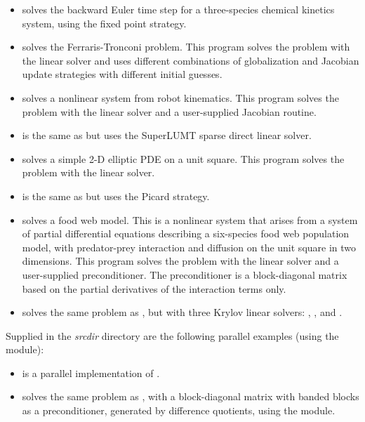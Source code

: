 \begin{itemize}
\item {}
  solves the backward Euler time step for a three-species chemical kinetics
  system, using the fixed point strategy.
\item {}
  solves the Ferraris-Tronconi problem.
  \newline
  This program solves the problem with the {\kindense} linear solver
  and uses different combinations of globalization and Jacobian
  update strategies with different initial guesses.
\item {}
  solves a nonlinear system from robot kinematics.
  \newline
  This program solves the problem with the {\kindense} linear solver
  and a user-supplied Jacobian routine.
\item {}
  is the same as  but uses the SuperLUMT sparse direct
  linear solver.
\item {}
  solves a simple 2-D elliptic PDE on a unit square.
 \newline
  This program solves the problem with the {\kinband} linear solver.
\item {}
  is the same as  but uses the Picard strategy.
\item {}
  solves a food web model.
  \newline
  This is a nonlinear system that arises from a system of partial
  differential equations describing a six-species food web population
  model, with predator-prey interaction and diffusion on the unit
  square in two dimensions.
  This program solves the problem with the {\kinspgmr} linear solver
  and a user-supplied preconditioner. The preconditioner is a
  block-diagonal matrix based on the partial derivatives of the
  interaction terms only.
\item {}
  solves the same problem as , but with three Krylov
  linear solvers: , , and .
\end{itemize}

\vspace{0.2in}\noindent
Supplied in the {\em srcdir} directory are
the following parallel examples (using the {\nvecp} module):
\begin{itemize}
\item {}
  is a parallel implementation of .
\item {}
  solves the same problem as , with a block-diagonal matrix
  with banded blocks as a preconditioner, generated by difference quotients,
  using the {\kinbbdpre} module.
\end{itemize}

